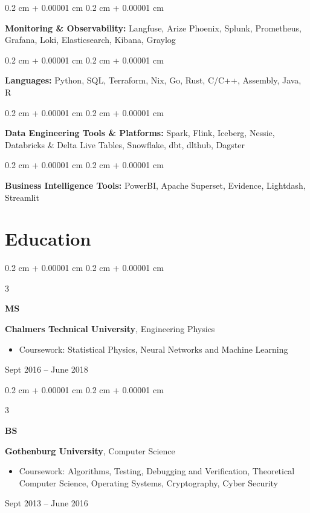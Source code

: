 \documentclass[10pt, letterpaper]{article}
\newenvironment{highlights}{
    \begin{itemize}[
        topsep=0.10 cm,
        parsep=0.10 cm,
        partopsep=0pt,
        itemsep=0pt,
        leftmargin=0.4 cm + 10pt
    ]
}{
    \end{itemize}
} %
\newenvironment{onecolentry}{
    \begin{adjustwidth}{
        0.2 cm + 0.00001 cm
    }{
        0.2 cm + 0.00001 cm
    }
}{
    \end{adjustwidth}
} %
\newenvironment{threecolentry}[3][]{
    \onecolentry
    \def\thirdColumn{#3}
    \setcolumnwidth{1 cm, \fill, 4.5 cm}
    \begin{paracol}{3}
    {\raggedright #2} \switchcolumn
}{
    \switchcolumn \raggedleft \thirdColumn
    \end{paracol}
    \endonecolentry
} %
\begin{document}
        \begin{onecolentry}
            \textbf{Monitoring \& Observability:} Langfuse, Arize Phoenix, Splunk, Prometheus, Grafana, Loki, Elasticsearch, Kibana, Graylog
        \end{onecolentry}

        \vspace{0.2 cm}

        \begin{onecolentry}
            \textbf{Languages:} Python, SQL, Terraform, Nix, Go, Rust, C/C++, Assembly, Java, R
        \end{onecolentry}

        \vspace{0.2 cm}

        \begin{onecolentry}
            \textbf{Data Engineering Tools \& Platforms:} Spark, Flink, Iceberg, Nessie, Databricks \& Delta Live Tables, Snowflake, dbt, dlthub, Dagster
        \end{onecolentry}

        \vspace{0.2 cm}

        \begin{onecolentry}
            \textbf{Business Intelligence Tools:} PowerBI, Apache Superset, Evidence, Lightdash, Streamlit
        \end{onecolentry}


    
    \section{Education}



        
        \begin{threecolentry}{\textbf{MS}}{
            Sept 2016 – June 2018
        }
            \textbf{Chalmers Technical University}, Engineering Physics
            \begin{highlights}
                \item Coursework: Statistical Physics, Neural Networks and Machine Learning
            \end{highlights}
        \end{threecolentry}

        \vspace{0.2 cm}

        \begin{threecolentry}{\textbf{BS}}{
            Sept 2013 – June 2016
        }
            \textbf{Gothenburg University}, Computer Science
            \begin{highlights}
                \item Coursework: Algorithms, Testing, Debugging and Verification, Theoretical Computer Science, Operating Systems, Cryptography, Cyber Security
            \end{highlights}
        \end{threecolentry}
\end{document}
